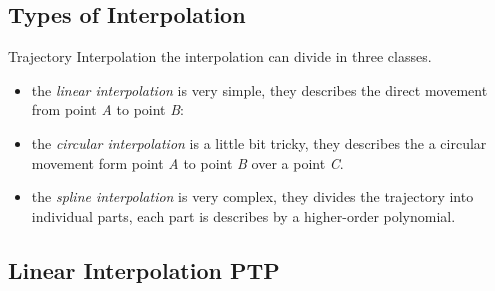 \documentclass[%
  professionalfonts,%
  xcolor={%
    usenames,%
    dvipsnames,%
    svgnames,%
    table,%
    hyperref%
  }%
]{beamer}
\begin{document}
\subsection{Types of Interpolation}
\begin{frame}{Trajectory Interpolation}
the interpolation can divide in three classes.
\begin{itemize}
\item the \emph{linear interpolation} is very simple, they describes the direct movement from point \emph{A} to point \emph{B}:
\item the \emph{circular interpolation} is a little bit tricky, they describes the a circular movement form point \emph{A} to point \emph{B} over a point \emph{C}.
\item the \emph{spline interpolation} is very complex, they divides the trajectory into individual parts, each part is describes by a higher-order polynomial.
\end{itemize}
\end{frame}

\subsection{Linear Interpolation PTP}
%

\end{document}

